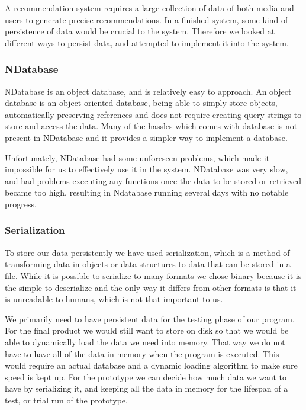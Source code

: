 A recommendation system requires a large collection of data of both media and users to generate precise recommendations. In a finished system, some kind of persistence of data would be crucial to the system. Therefore we looked at different ways to persist data, and attempted to implement it into the system.

\subsubsection{NDatabase}

NDatabase is an object database, and is relatively easy to approach. An object database is an object-oriented database, being able to simply store objects, automatically preserving references and does not require creating query strings to store and access the data. Many of the hassles which comes with database is not present in NDatabase and it provides a simpler way to implement a database. \cite{NDatabase}

Unfortunately, NDatabase had some unforeseen problems, which made it impossible for us to effectively use it in the system. NDatabase was very slow, and had problems executing any functions once the data to be stored or retrieved became too high, resulting in Ndatabase running several days with no notable progress.

\subsubsection{Serialization}

To store our data persistently we have used serialization, which is a method of transforming data in objects or data structures to data that can be stored in a file\cite{Serialization}. While it is possible to serialize to many formats we chose binary because it is the simple to deserialize and the only way it differs from other formats is that it is unreadable to humans, which is not that important to us. 

We primarily need to have persistent data for the testing phase of our program. For the final product we would still want to store on disk so that we would be able to dynamically load the data we need into memory. That way we do not have to have all of the data in memory when the program is executed. This would require an actual database and a dynamic loading algorithm to make sure speed is kept up. For the prototype we can decide how much data we want to have by serializing it, and keeping all the data in memory for the lifespan of a test, or trial run of the prototype.